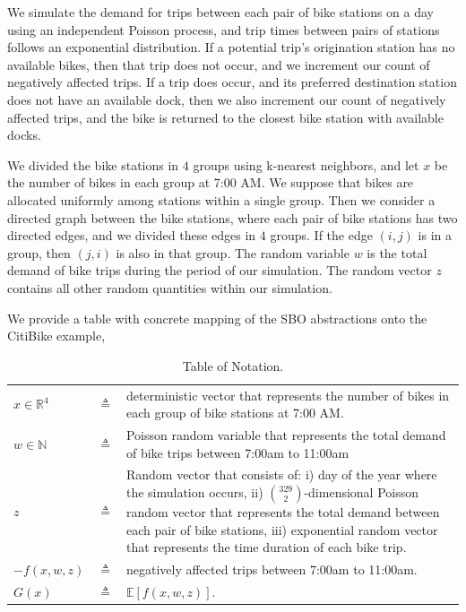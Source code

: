 \documentclass{article}
\newcommand{\w}{w}
\newcommand{\z}{z}
\begin{document}
We simulate the demand for trips between each pair of bike stations on a day using an independent Poisson process, and trip times between pairs of stations follows an exponential distribution. 
If a potential trip's origination station has no available bikes, then that trip does not occur, and we increment our count of negatively affected trips.  If a trip does occur, and its preferred destination station does not have an available dock, then we also increment our count of negatively affected trips, and the bike is returned to the closest bike station with available docks.

We divided the bike stations in $4$ groups using k-nearest neighbors, and let $x$ be the number of bikes in each group at 7:00 AM. We suppose that bikes are allocated uniformly among stations within a single group.  Then we consider a directed graph between the bike stations, where each pair of bike stations has two directed edges, and we divided these edges in $4$ groups. If the edge $(i,j)$ is in a group, then $(j,i)$ is also in that group. The random variable $\w$ is the total demand of bike trips during the period of our simulation. The random vector $\z$ contains all other random quantities within our simulation.

We provide a table with concrete mapping of the SBO abstractions onto the CitiBike example,
\begin{table}[htbp]
\caption{Table of Notation.}
\label{table}
\centering
\begin{center}
\begin{small}
\begin{tabular}{lrp{5.5cm}}
\hline
$x\in\mathbb{R}^{4}$ & $\triangleq$ & deterministic vector that represents the number of bikes in each group of bike stations at 7:00 AM.\\
$\w\in\mathbb{N}$ & $\triangleq$ & Poisson random variable that represents the total demand of bike trips between 7:00am to 11:00am\\
$\z$ & $\triangleq$ & Random vector that consists of: i) day of the year where the simulation occurs, ii) $\binom{329}{2}$-dimensional Poisson random vector that represents the total demand between each pair of bike stations, iii) exponential random vector that represents the time duration of each bike trip. \\
$-f(x,\w,\z)$ & $\triangleq$ & negatively affected trips between 7:00am to 11:00am.\\
$G(x)$ & $\triangleq$ & $\mathbb{E}[f(x,\w,\z)]$. \\
\end{tabular}
\end{small}
\end{center}
\end{table}
\end{document}

